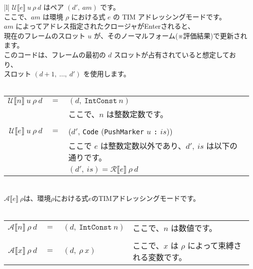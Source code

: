 \documentclass{jarticle}
\begin{document}
\begin{tabular} {|l|} \hline
	$\mathcal{U} \llbracket e \rrbracket ~ u ~ \rho ~ d$ はペア $(d', ~ am)$ です。                        \\
	ここで、$am$ は環境 $\rho$ における式 $e$ の TIM アドレッシングモードです。                            \\
	$am$ によってアドレス指定されたクロージャがEnterされると、                                             \\
	現在のフレームのスロット $u$ が、そのノーマルフォーム(※評価結果)で更新されます。                       \\
	このコードは、フレームの最初の $d$ スロットが占有されていると想定しており、                            \\
	スロット $(d + 1, ~ \ldots, ~ d')$ を使用します。                                                      \\
	\\
	\begin{tabular}{r c l}
		$\mathcal{U} \llbracket n \rrbracket ~ u ~ \rho ~ d$ & $=$ & $(d, ~ \texttt{IntConst} ~ n)$                                  \\
		                                                     &     & ここで、$n$ は整数定数です。                                    \\
		\\
		$\mathcal{U} \llbracket e \rrbracket ~ u ~ \rho ~ d$ & $=$ & ($d'$, \texttt{Code} (\texttt{PushMarker} $u$ \texttt{:} $is$)) \\
		                                                     &     & ここで $e$ は整数定数以外であり、$d', ~ is$ は以下の通りです。  \\
		                                                     &     & $(d', ~ is) = \mathcal{R} \llbracket e \rrbracket ~ \rho ~ d$   \\
	\end{tabular}
	\\ \hline
	$\mathcal{A} \llbracket e \rrbracket ~ \rho$は、環境$\rho$における式$e$のTIMアドレッシングモードです。 \\
	\\
	\begin{tabular}{r c l l}
		$\mathcal{A} \llbracket n \rrbracket ~ \rho ~ d$ & $=$ & $(d, ~ \texttt{IntConst} ~ n)$ & ここで、$n$ は数値です。                           \\
		\\
		$\mathcal{A} \llbracket x \rrbracket ~ \rho ~ d$ & $=$ & $(d, ~ \rho ~ x)$              & ここで、$x$ は $\rho$ によって束縛される変数です。 \\

\end{tabular}
\end{tabular}
\end{document}
